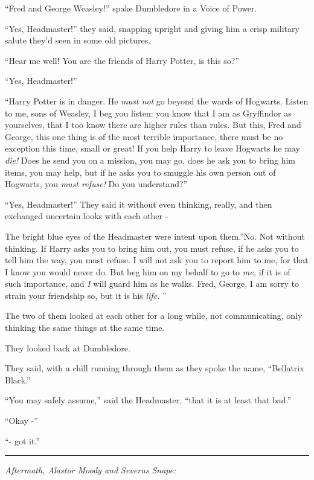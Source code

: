 ``Fred and George Weasley!'' spake Dumbledore in a Voice of Power.

``Yes, Headmaster!'' they said, snapping upright and giving him a crisp
military salute they'd seen in some old pictures.

``Hear me well! You are the friends of Harry Potter, is this so?''

``Yes, Headmaster!''

``Harry Potter is in danger. He \emph{must not} go beyond the wards of
Hogwarts. Listen to me, sons of Weasley, I beg you listen: you know that
I am as Gryffindor as yourselves, that I too know there are higher rules
than rules. But this, Fred and George, this one thing is of the most
terrible importance, there must be no exception this time, small or
great! If you help Harry to leave Hogwarts he may \emph{die!} Does he
send you on a mission, you may go, does he ask you to bring him items,
you may help, but if he asks you to smuggle his own person out of
Hogwarts, you \emph{must refuse!} Do you understand?''

``Yes, Headmaster!'' They said it without even thinking, really, and
then exchanged uncertain looks with each other -

The bright blue eyes of the Headmaster were intent upon them.''No. Not
without thinking. If Harry asks you to bring him out, you must refuse,
if he asks you to tell him the way, you must refuse. I will not ask you
to report him to me, for that I know you would never do. But beg him on
my behalf to go to \emph{me,} if it is of such importance, and \emph{I}
will guard him as he walks. Fred, George, I am sorry to strain your
friendship so, but it is his \emph{life.} ''

The two of them looked at each other for a long while, not
communicating, only thinking the same things at the same time.

They looked back at Dumbledore.

They said, with a chill running through them as they spoke the name,
``Bellatrix Black.''

``You may safely assume,'' said the Headmaster, ``that it is at least
that bad.''

``Okay -''

``- got it.''

\begin{center}\rule{3in}{0.4pt}\end{center}

\emph{Aftermath, Alastor Moody and Severus Snape:}

